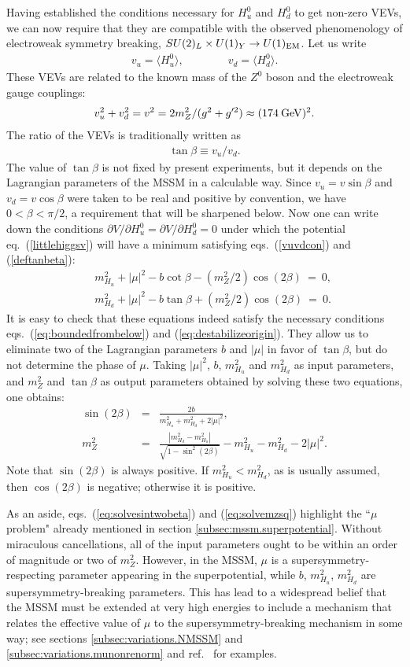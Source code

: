 \documentclass[11pt]{article}
\def\beq{\begin{eqnarray}}
\def\eeq{\end{eqnarray}}
\begin{document}
Having established the conditions necessary for $H_u^0$ and $H_d^0$ to get 
non-zero VEVs, we can now require that they are compatible with the 
observed phenomenology of electroweak symmetry breaking, $SU(2)_L \times 
U(1)_Y \rightarrow U(1)_{\rm EM}$. Let us write
\beq
v_u = \langle H_u^0\rangle,
\qquad\qquad
v_d = \langle H_d^0\rangle.
\label{defvuvd}
\eeq
These VEVs are related to the known mass of the $Z^0$ boson and the 
electroweak gauge couplings:
\beq
v_u^2 + v_d^2 = v^2 = 2 m_Z^2/(g^2 + g^{\prime 2}) \approx (174\>{\rm
GeV})^2.
\label{vuvdcon}
\eeq
The ratio of the VEVs is traditionally written as
\beq
\tan\beta \equiv v_u/v_d.
\label{deftanbeta}
\eeq
The value of $\tan\beta$ is not fixed by present experiments, but it 
depends on the Lagrangian parameters of the MSSM in a calculable way. 
Since $v_u = v \sin\beta$ and $v_d = v \cos\beta$ were taken to be real 
and positive by convention, 
we have $0 < \beta < \pi/2$, a requirement that will be 
sharpened below. Now one can write down the conditions $\partial 
V/\partial H_u^0= \partial V/\partial H_d^0 = 0$ under which the potential 
eq.~(\ref{littlehiggsv}) will have a minimum satisfying 
eqs.~(\ref{vuvdcon}) and (\ref{deftanbeta}):
\beq
&&m_{H_u}^2 + |\mu |^2 -b \cot\beta - (m_Z^2/2) \cos (2\beta) 
\>=\> 0 ,
\label{mubsub2}
\\
&&m_{H_d}^2 + |\mu |^2 -b \tan\beta + (m_Z^2/2) \cos (2\beta) \>=\> 0.
\label{mubsub1}
\eeq
It is easy to check that these equations indeed satisfy the necessary 
conditions eqs.~(\ref{eq:boundedfrombelow}) and 
(\ref{eq:destabilizeorigin}). They allow us to eliminate two of the 
Lagrangian parameters $b$ and $|\mu|$ in favor of $\tan\beta$, but do not 
determine the phase of $\mu$. Taking $|\mu|^2$, $b$, $m_{H_u}^2$ and 
$m_{H_d}^2$ as input parameters, and $m_Z^2$ and $\tan\beta$ as output 
parameters obtained by solving these two equations, one obtains:
\beq
\sin (2\beta) &=& \frac{2 b}{m^2_{H_u} + m^2_{H_d} + 2|\mu|^2},
\label{eq:solvesintwobeta}
\\
m_Z^2 &=& \frac{|m^2_{H_d} - m^2_{H_u}|}{\sqrt{1 - \sin^2(2\beta)}}
- m^2_{H_u} - m^2_{H_d} -2|\mu|^2
.
\label{eq:solvemzsq}
\eeq
Note that $\sin (2\beta)$ is always positive. If $m^2_{H_u} < m^2_{H_d}$, 
as is usually assumed, then $\cos(2\beta)$ is negative; otherwise it is 
positive.

As an aside, eqs.~(\ref{eq:solvesintwobeta}) and 
(\ref{eq:solvemzsq}) highlight the ``$\mu$ problem" already mentioned in 
section \ref{subsec:mssm.superpotential}.  Without miraculous 
cancellations, all of the input parameters ought to be within an order of 
magnitude or two of $m^2_Z$. However, in the MSSM, $\mu$ is a 
supersymmetry-respecting parameter appearing in the superpotential, while 
$b$, $m_{H_u}^2$, $m_{H_d}^2$ are supersymmetry-breaking parameters. This 
has lead to a widespread belief that the MSSM must be extended at very 
high energies to include a mechanism that relates the effective value of 
$\mu$ to the supersymmetry-breaking mechanism in some way; see sections 
\ref{subsec:variations.NMSSM} and 
\ref{subsec:variations.munonrenorm} and
ref.~\cite{muproblemGMSB} for examples.
\end{document}
